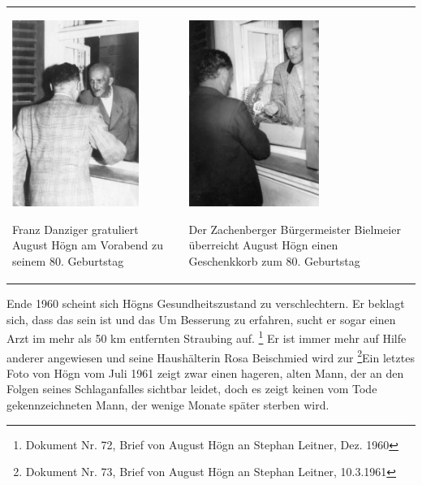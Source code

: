 \begin{center}
\begin{minipage}{9.146cm}
\begin{center}
\tablefirsthead{}
\tablehead{}
\tabletail{}
\tablelasttail{}
\begin{supertabular}{m{4.309cm}m{4.4370003cm}}

\includegraphics[width=4.128cm,height=6.071cm]{pictures/zulassungsarbeit-img054.jpg}

Franz Danziger gratuliert August Högn
am Vorabend zu seinem 80. Geburtstag &

\includegraphics[width=4.255cm,height=6.073cm]{pictures/zulassungsarbeit-img055.jpg}

Der Zachenberger Bürgermeister
Bielmeier überreicht August Högn einen Geschenkkorb zum 80.
Geburtstag\\
\end{supertabular}
\end{center}
\end{minipage}
\end{center}
Ende 1960 scheint sich Högns Gesundheitszustand zu verschlechtern. Er
beklagt sich, dass das sein  ist und das Um Besserung zu erfahren, sucht er sogar einen Arzt im
mehr als 50 km entfernten Straubing auf. \footnote{Dokument Nr. 72,
Brief von August Högn an Stephan Leitner, Dez. 1960} Er ist immer mehr
auf Hilfe anderer angewiesen und seine Haushälterin Rosa Beischmied
wird zur  \footnote{Dokument
Nr. 73, Brief von August Högn an Stephan Leitner,
10.3.1961}Ein letztes Foto von Högn vom Juli
1961 zeigt zwar einen hageren, alten Mann, der an den Folgen seines
Schlaganfalles sichtbar leidet, doch es zeigt keinen vom Tode
gekennzeichneten Mann, der wenige Monate später sterben wird.

